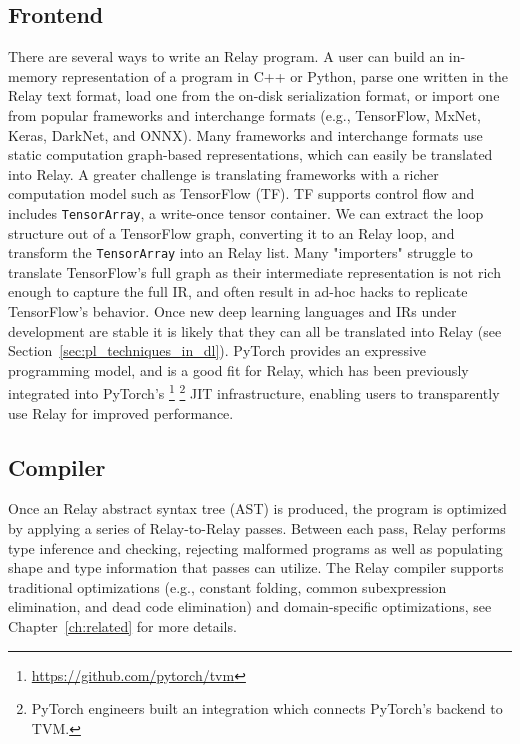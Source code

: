 \subsection{Frontend}

There are several ways to write an Relay program.
A user can build an in-memory representation of
    a program in C++ or Python,
    parse one written in the Relay text format,
    load one from the on-disk serialization format,
    or import one from popular frameworks and interchange formats
    (e.g., TensorFlow, MxNet, Keras, DarkNet, and ONNX).
Many frameworks and interchange formats use static computation graph-based representations,
    which can easily be translated into Relay.
A greater challenge is translating frameworks
    with a richer computation model such as TensorFlow (TF).
TF supports control flow and includes \verb|TensorArray|, a write-once
    tensor container.
We can extract the loop structure out of a TensorFlow graph, converting
    it to an Relay loop, and transform the \verb|TensorArray| into an Relay list.
Many "importers" struggle to translate TensorFlow's full graph as their intermediate representation
  is not rich enough to capture the full IR, and often result in ad-hoc hacks to replicate
  TensorFlow's behavior.
Once new deep learning languages and IRs under development
    are stable it is likely that they can all be translated into Relay (see
    Section~\ref{sec:pl_techniques_in_dl}).
PyTorch provides an expressive programming model, and is a good fit
    for Relay, which has been previously integrated into PyTorch's
    \footnote{\url{https://github.com/pytorch/tvm}}
    \footnote{PyTorch engineers built an integration which connects PyTorch's backend to TVM.}
    JIT infrastructure, enabling users to transparently use Relay for improved performance.

\subsection{Compiler}
Once an Relay abstract syntax tree (AST) is produced,
    the program is optimized by applying a series of Relay-to-Relay
    passes.
Between each pass, Relay performs type inference and checking,
    rejecting malformed programs as well as populating shape and type
    information that passes can utilize.
The Relay compiler supports traditional optimizations
    (e.g., constant folding, common subexpression elimination, and dead code elimination)
    and domain-specific optimizations, see Chapter~\ref{ch:related} for more details.


